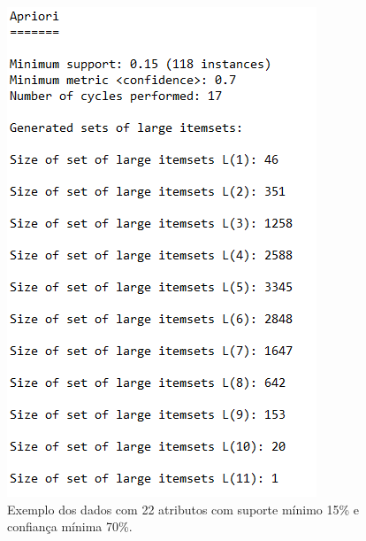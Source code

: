 \par
\begin{figure}[!htp]
	\begin{center}
    \caption{\label{fig:waveform_fig} Exemplo dos dados com 22 atributos com suporte mínimo 15\% e confiança mínima 70\%.}
	\includegraphics[scale=0.90]{Figuras/Resultados_valores_apriori.png}
	\end{center}
\end{figure}

\par
\textcolor{red}{}